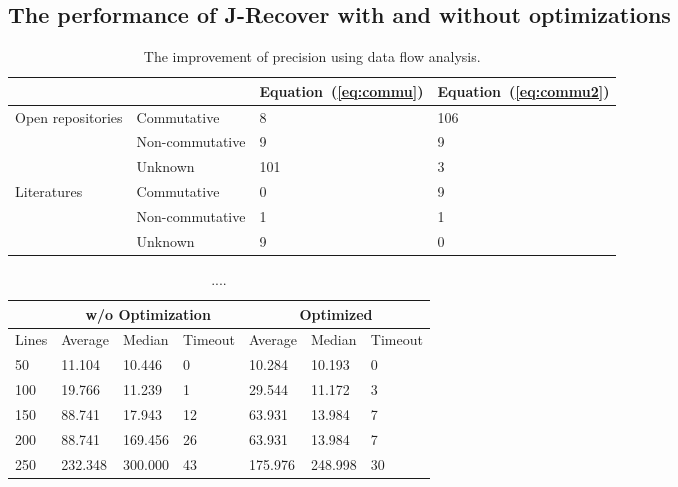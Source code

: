 \documentclass{llncs}
\begin{document}
\subsection{The performance of J-Recover with and without optimizations}

\begin{table}
	\centering
	\begin{tabular}{|l|l|l|l|}
		\hline
		& &Equation~(\ref{eq:commu})	& Equation~(\ref{eq:commu2}) \\
		\hline
		\hline
		\multirow{3}{*}{Open repositories}&Commutative& 8&106\\ 
		\cline{2-4}
		&Non-commutative&9&9\\
		\cline{2-4}
		&Unknown&101&3\\
		\hline
		\hline
		\multirow{3}{*}{Literatures}&Commutative& 0&9\\
		\cline{2-4}
		&Non-commutative&1&1\\
		\cline{2-4}
		&Unknown&9&0\\
		\hline
	\end{tabular}
	\caption{The improvement of precision using data flow analysis.}
	\label{tab:opt1}
\end{table}


\begin{table}
	\begin{tabular}{|l|l|l|l|l|l|l|}
\hline
		& \multicolumn{3}{c|}{\small w/o Optimization}	& \multicolumn{3}{c|}{\small Optimized} \\
\hline
		\small Lines & \small Average & \small Median & \small Timeout & \small Average & \small Median & \small Timeout \\
\hline
\hline
		50	&	11.104	&	10.446	&	0	&	10.284	&	10.193	&	0	\\
\hline                                                                              
		100	&	19.766	&	11.239	&	1	&	29.544	&	11.172	&	3	\\
\hline                                                                             
		150	&	88.741	&	17.943	&	12	&	63.931	&	13.984	&	7	\\
\hline                                                                             
		200	&	88.741	&	169.456	&	26	&	63.931	&	13.984	&	7	\\
\hline                                                                             
		250	&	232.348	&	300.000	&	43	&	175.976	&	248.998	&	30	\\
\hline
	\end{tabular}
	\caption{....}
	\label{tab:opt2}
\end{table}
\end{document}
